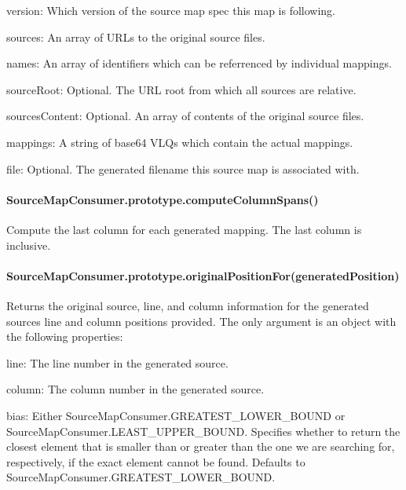 \begin{DoxyItemize}
\item {\ttfamily version}\+: Which version of the source map spec this map is following.
\item {\ttfamily sources}\+: An array of U\+R\+Ls to the original source files.
\item {\ttfamily names}\+: An array of identifiers which can be referrenced by individual mappings.
\item {\ttfamily source\+Root}\+: Optional. The U\+RL root from which all sources are relative.
\item {\ttfamily sources\+Content}\+: Optional. An array of contents of the original source files.
\item {\ttfamily mappings}\+: A string of base64 V\+L\+Qs which contain the actual mappings.
\item {\ttfamily file}\+: Optional. The generated filename this source map is associated with.
\end{DoxyItemize}

\paragraph*{Source\+Map\+Consumer.\+prototype.\+compute\+Column\+Spans()}

Compute the last column for each generated mapping. The last column is inclusive.

\paragraph*{Source\+Map\+Consumer.\+prototype.\+original\+Position\+For(generated\+Position)}

Returns the original source, line, and column information for the generated source\textquotesingle{}s line and column positions provided. The only argument is an object with the following properties\+:


\begin{DoxyItemize}
\item {\ttfamily line}\+: The line number in the generated source.
\item {\ttfamily column}\+: The column number in the generated source.
\item {\ttfamily bias}\+: Either {\ttfamily Source\+Map\+Consumer.\+G\+R\+E\+A\+T\+E\+S\+T\+\_\+\+L\+O\+W\+E\+R\+\_\+\+B\+O\+U\+ND} or {\ttfamily Source\+Map\+Consumer.\+L\+E\+A\+S\+T\+\_\+\+U\+P\+P\+E\+R\+\_\+\+B\+O\+U\+ND}. Specifies whether to return the closest element that is smaller than or greater than the one we are searching for, respectively, if the exact element cannot be found. Defaults to {\ttfamily Source\+Map\+Consumer.\+G\+R\+E\+A\+T\+E\+S\+T\+\_\+\+L\+O\+W\+E\+R\+\_\+\+B\+O\+U\+ND}.
\end{DoxyItemize}

